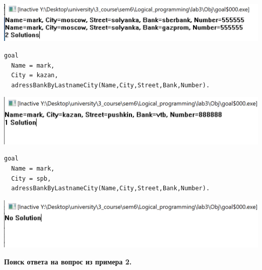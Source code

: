 \documentclass[a4paper,14pt]{extreport} %
\begin{document}
\begin{enumerate}
\includegraphics[scale=0.8]{ex7}

\begin{lstlisting}[caption=Пример 2 задание 2]
goal
  Name = mark,
  City = kazan,
  adressBankByLastnameCity(Name,City,Street,Bank,Number).
\end{lstlisting}

\includegraphics[scale=0.8]{ex8}

\begin{lstlisting}[caption=Пример 3 задание 2]
goal
  Name = mark,
  City = spb,
  adressBankByLastnameCity(Name,City,Street,Bank,Number).
\end{lstlisting}

\includegraphics[scale=0.8]{ex9}

\end{enumerate}

\textbf{Поиск ответа на вопрос из примера 2. }
\end{document}
